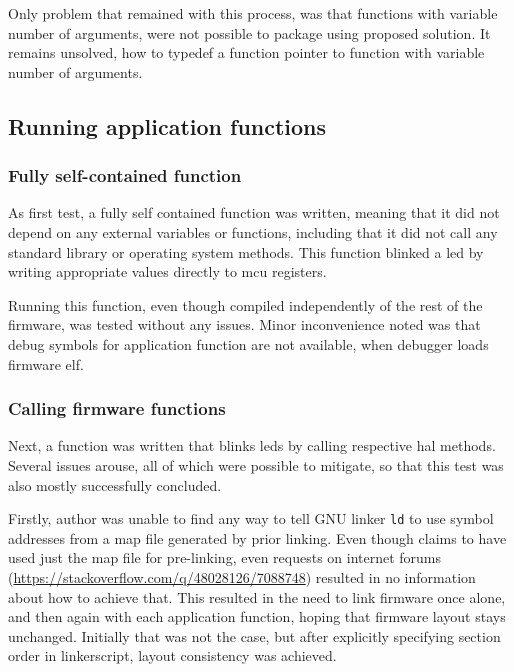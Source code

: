 Only problem that remained with this process, was that functions with variable number of arguments, were not possible to package using proposed solution. It remains unsolved, how to typedef a function pointer to function with variable number of arguments.

\subsection{Running application functions}

\subsubsection{Fully self-contained function}

As first test, a fully self contained function was written, meaning that it did not depend on any external variables or functions, including that it did not call any standard library or operating system methods. This function blinked a \gls{led} by writing appropriate values directly to \gls{mcu} registers.

Running this function, even though compiled independently of the rest of the firmware, was tested without any issues. Minor inconvenience noted was that debug symbols for application function are not available, when debugger loads firmware elf.

\subsubsection{Calling firmware functions}

Next, a function was written that blinks \glspl{led} by calling respective \gls{hal} methods. Several issues arouse, all of which were possible to mitigate, so that this test was also mostly successfully concluded.

Firstly, author was unable to find any way to tell GNU linker \texttt{ld} to use symbol addresses from a map file generated by prior linking. Even though \textcite{Dunkels2006} claims to have used just the map file for pre-linking, even requests on internet forums (\url{https://stackoverflow.com/q/48028126/7088748}) resulted in no information about how to achieve that. This resulted in the need to link firmware once alone, and then again with each application function, hoping that firmware layout stays unchanged. Initially that was not the case, but after explicitly specifying section order in linkerscript, layout consistency was achieved.

